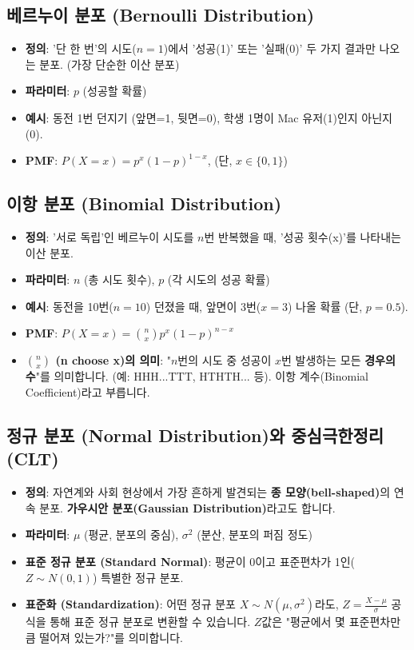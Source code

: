 \documentclass[11pt,a4paper]{book}
\theoremstyle{definition}
\begin{document}
\subsection{베르누이 분포 (Bernoulli Distribution)}
\begin{itemize}
    \item \textbf{정의}: '단 한 번'의 시도($n=1$)에서 '성공(1)' 또는 '실패(0)' 두 가지 결과만 나오는 분포. (가장 단순한 이산 분포)
    \item \textbf{파라미터}: $p$ (성공할 확률)
    \item \textbf{예시}: 동전 1번 던지기 (앞면=1, 뒷면=0), 학생 1명이 Mac 유저(1)인지 아닌지(0).
    \item \textbf{PMF}: $P(X=x) = p^x (1-p)^{1-x}$, (단, $x \in \{0, 1\}$)
\end{itemize}

\subsection{이항 분포 (Binomial Distribution)}
\begin{itemize}
    \item \textbf{정의}: '서로 독립'인 베르누이 시도를 $n$번 반복했을 때, '성공 횟수(x)'를 나타내는 이산 분포.
    \item \textbf{파라미터}: $n$ (총 시도 횟수), $p$ (각 시도의 성공 확률)
    \item \textbf{예시}: 동전을 10번($n=10$) 던졌을 때, 앞면이 3번($x=3$) 나올 확률 (단, $p=0.5$).
    \item \textbf{PMF}: $P(X=x) = \binom{n}{x} p^x (1-p)^{n-x}$
    \item \textbf{$\binom{n}{x}$ (n choose x)의 의미}: "$n$번의 시도 중 성공이 $x$번 발생하는 모든 \textbf{경우의 수}"를 의미합니다. (예: HHH...TTT, HTHTH... 등). 이항 계수(Binomial Coefficient)라고 부릅니다.
\end{itemize}

\subsection{정규 분포 (Normal Distribution)와 중심극한정리 (CLT)}
\begin{itemize}
    \item \textbf{정의}: 자연계와 사회 현상에서 가장 흔하게 발견되는 \textbf{종 모양(bell-shaped)}의 연속 분포. \textbf{가우시안 분포(Gaussian Distribution)}라고도 합니다.
    \item \textbf{파라미터}: $\mu$ (평균, 분포의 중심), $\sigma^2$ (분산, 분포의 퍼짐 정도)
    \item \textbf{표준 정규 분포 (Standard Normal)}: 평균이 0이고 표준편차가 1인($Z \sim N(0, 1)$) 특별한 정규 분포.
    \item \textbf{표준화 (Standardization)}: 어떤 정규 분포 $X \sim N(\mu, \sigma^2)$라도, $Z = \frac{X - \mu}{\sigma}$ 공식을 통해 표준 정규 분포로 변환할 수 있습니다. $Z$값은 "평균에서 몇 표준편차만큼 떨어져 있는가?"를 의미합니다.
\end{itemize}
\end{document}
